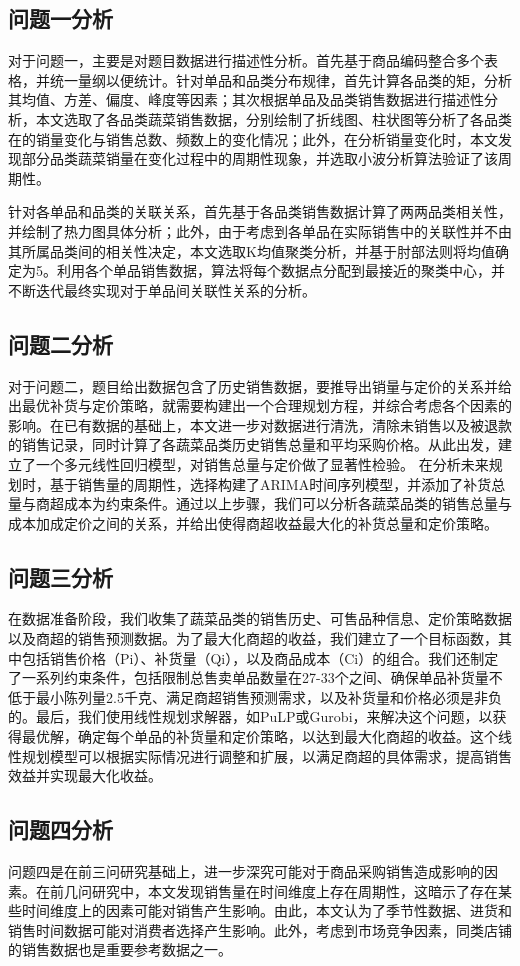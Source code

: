 \documentclass[withoutpreface,bwprint]{cumcmthesis} %
\begin{document}
		\subsection{问题一分析}
		对于问题一，主要是对题目数据进行描述性分析。首先基于商品编码整合多个表格，并统一量纲以便统计。针对单品和品类分布规律，首先计算各品类的矩，分析其均值、方差、偏度、峰度等因素；其次根据单品及品类销售数据进行描述性分析，本文选取了各品类蔬菜销售数据，分别绘制了折线图、柱状图等分析了各品类在的销量变化与销售总数、频数上的变化情况；此外，在分析销量变化时，本文发现部分品类蔬菜销量在变化过程中的周期性现象，并选取小波分析算法验证了该周期性。
		
		针对各单品和品类的关联关系，首先基于各品类销售数据计算了两两品类相关性，并绘制了热力图具体分析；此外，由于考虑到各单品在实际销售中的关联性并不由其所属品类间的相关性决定，本文选取K均值聚类分析，并基于肘部法则将均值确定为5。利用各个单品销售数据，算法将每个数据点分配到最接近的聚类中心，并不断迭代最终实现对于单品间关联性关系的分析。
		\subsection{问题二分析}
		对于问题二，题目给出数据包含了历史销售数据，要推导出销量与定价的关系并给出最优补货与定价策略，就需要构建出一个合理规划方程，并综合考虑各个因素的影响。在已有数据的基础上，本文进一步对数据进行清洗，清除未销售以及被退款的销售记录，同时计算了各蔬菜品类历史销售总量和平均采购价格。从此出发，建立了一个多元线性回归模型，对销售总量与定价做了显著性检验。
		在分析未来规划时，基于销售量的周期性，选择构建了ARIMA时间序列模型，并添加了补货总量与商超成本为约束条件。通过以上步骤，我们可以分析各蔬菜品类的销售总量与成本加成定价之间的关系，并给出使得商超收益最大化的补货总量和定价策略。
		\subsection{问题三分析}
		在数据准备阶段，我们收集了蔬菜品类的销售历史、可售品种信息、定价策略数据以及商超的销售预测数据。为了最大化商超的收益，我们建立了一个目标函数，其中包括销售价格（Pi）、补货量（Qi），以及商品成本（Ci）的组合。我们还制定了一系列约束条件，包括限制总售卖单品数量在27-33个之间、确保单品补货量不低于最小陈列量2.5千克、满足商超销售预测需求，以及补货量和价格必须是非负的。最后，我们使用线性规划求解器，如PuLP或Gurobi，来解决这个问题，以获得最优解，确定每个单品的补货量和定价策略，以达到最大化商超的收益。这个线性规划模型可以根据实际情况进行调整和扩展，以满足商超的具体需求，提高销售效益并实现最大化收益。
		\subsection{问题四分析}
		问题四是在前三问研究基础上，进一步深究可能对于商品采购销售造成影响的因素。在前几问研究中，本文发现销售量在时间维度上存在周期性，这暗示了存在某些时间维度上的因素可能对销售产生影响。由此，本文认为了季节性数据、进货和销售时间数据可能对消费者选择产生影响。此外，考虑到市场竞争因素，同类店铺的销售数据也是重要参考数据之一。
\end{document}
